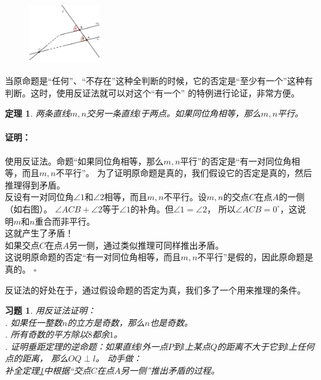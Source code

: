 \documentclass[12pt,UTF8]{ctexbook}
\newtheorem{tm}{定理}[section]
\newenvironment{proof2}{\paragraph{\textbf{证明：}}}{\hfill$\square$}
\newtheorem{xt}{习题}[section]
\begin{document}
\begin{figure} %
    \vspace{10pt}
    \includegraphics[width=0.27\textwidth]{反证法1.png}
\end{figure}
当原命题是“任何”、“不存在”这种全判断的时候，它的否定是“至少有一个”这种有判断。这时，使用反证法就可以对这个“有一个”
的特例进行论证，非常方便。

\begin{tm}\label{tm:2-0-0}
    两条直线$m,n$交另一条直线$l$于两点。如果同位角相等，那么$m,n$平行。
\end{tm}
\begin{proof2}
    使用反证法。命题“如果同位角相等，那么$m,n$平行”的否定是“有一对同位角相等，而且$m,n$不平行”。
    为了证明原命题是真的，我们假设它的否定是真的，然后推理得到矛盾。\\
    反设有一对同位角$\angle 1$和$\angle 2$相等，而且$m,n$不平行。设$m,n$的交点$C$在点$A$的一侧（如右图）。
    $\angle ACB + \angle 2$等于$\angle 1$的补角。但$\angle 1 = \angle 2$，
    所以$\angle ACB = 0^\circ$，这说明$m$和$n$重合而非平行。\\
    这就产生了矛盾！\\
    如果交点$C$在点$A$另一侧，通过类似推理可同样推出矛盾。\\
    这说明原命题的否定“有一对同位角相等，而且$m,n$不平行”是假的，因此原命题是真的。
\end{proof2}

反证法的好处在于，通过假设命题的否定为真，我们多了一个用来推理的条件。

\begin{xt}
    用反证法证明：\\
    . 如果任一整数$n$的立方是奇数，那么$n$也是奇数。\\
    . 所有奇数的平方除以$8$都余$1$。\\
    . 证明垂距定理的逆命题：如果直线$l$外一点$P$到$l$上某点$Q$的距离不大于它到$l$上任何点的距离，
    那么$OQ \perp l$。
    动手做：\\
    \indent 补全定理\ref{tm:2-0-0}中根据“交点$C$在点$A$另一侧”推出矛盾的过程。
\end{xt}
\end{document}
